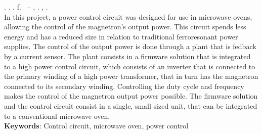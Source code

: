 
\begin{resumo}[ABSTRACT]
\begin{SingleSpacing}

\imprimirautorcitacao. \imprimirtitleabstract. \imprimirdata. \pageref {LastPage} f. \imprimirprojeto\ – \imprimirprograma, \imprimirinstituicao. \imprimirlocal, \imprimirdata.\\


In this project, a power control circuit was designed for use in microwave ovens, allowing the control of the magnetron's output power. This circuit spends less energy and has a reduced size in relation to traditional ferroresonant power supplies. The control of the output power is done through a plant that is fedback by a current sensor. The plant consists in a firmware solution that is integrated to a high power control circuit, which consists of an inverter that is connected to the primary winding of a high power transformer, that in turn has the magnetron connected to its secondary winding. Controlling the duty cycle and frequency makes the control of the magnetron output power possible. The firmware solution and the control circuit consist in a single, small sized unit, that can be integrated to a conventional microwave oven.\\


\textbf{Keywords}: Control circuit, microwave oven, power control 

\end{SingleSpacing}
\end{resumo}

